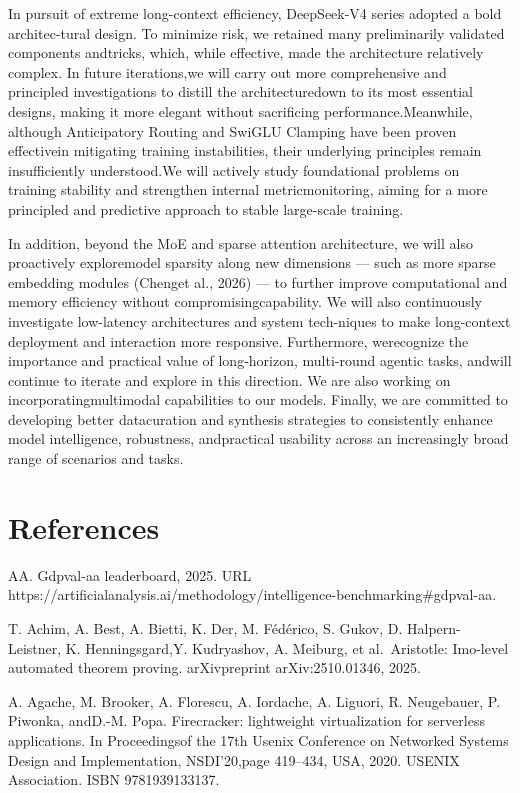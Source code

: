 \documentclass[
  10
]{article}
\begin{document}
In pursuit of extreme long-context efficiency, DeepSeek-V4 series
adopted a bold architec-tural design. To minimize risk, we retained many
preliminarily validated components andtricks, which, while effective,
made the architecture relatively complex. In future iterations,we will
carry out more comprehensive and principled investigations to distill
the architecturedown to its most essential designs, making it more
elegant without sacrificing performance.Meanwhile, although Anticipatory
Routing and SwiGLU Clamping have been proven effectivein mitigating
training instabilities, their underlying principles remain
insufficiently understood.We will actively study foundational problems
on training stability and strengthen internal metricmonitoring, aiming
for a more principled and predictive approach to stable large-scale
training.

In addition, beyond the MoE and sparse attention architecture, we will
also proactively exploremodel sparsity along new dimensions --- such as
more sparse embedding modules (Chenget al., 2026) --- to further improve
computational and memory efficiency without compromisingcapability. We
will also continuously investigate low-latency architectures and system
tech-niques to make long-context deployment and interaction more
responsive. Furthermore, werecognize the importance and practical value
of long-horizon, multi-round agentic tasks, andwill continue to iterate
and explore in this direction. We are also working on
incorporatingmultimodal capabilities to our models. Finally, we are
committed to developing better datacuration and synthesis strategies to
consistently enhance model intelligence, robustness, andpractical
usability across an increasingly broad range of scenarios and tasks.

\section{References}\label{references}

AA. Gdpval-aa leaderboard, 2025. URL
https://artificialanalysis.ai/methodology/intelligence-benchmarking\#gdpval-aa.

T. Achim, A. Best, A. Bietti, K. Der, M. Fédérico, S. Gukov, D.
Halpern-Leistner, K. Henningsgard,Y. Kudryashov, A. Meiburg, et
al.~Aristotle: Imo-level automated theorem proving. arXivpreprint
arXiv:2510.01346, 2025.

A. Agache, M. Brooker, A. Florescu, A. Iordache, A. Liguori, R.
Neugebauer, P. Piwonka, andD.-M. Popa. Firecracker: lightweight
virtualization for serverless applications. In Proceedingsof the 17th
Usenix Conference on Networked Systems Design and Implementation,
NSDI'20,page 419--434, USA, 2020. USENIX Association. ISBN
9781939133137.
\end{document}

